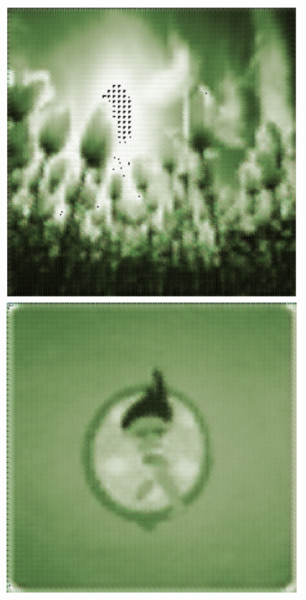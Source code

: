 \documentclass[]{article}
\begin{document}
	\begin{figure}[H]
		\includegraphics[scale=0.35]{m2_1.png}
		\includegraphics[scale=0.35]{m2_2.png}

\end{figure}
\end{document}
